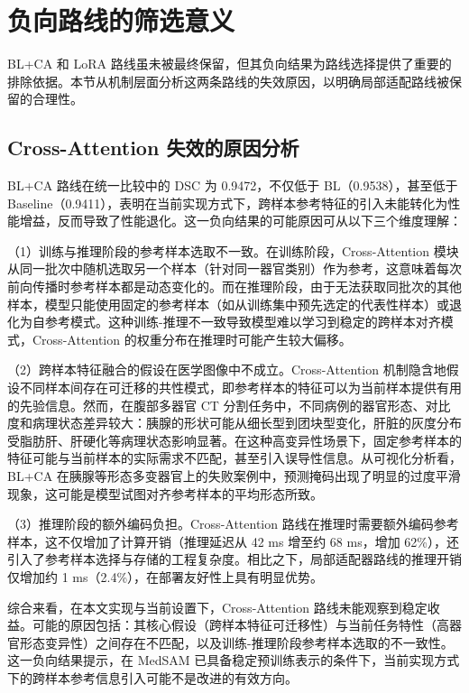 \section{负向路线的筛选意义}

BL+CA 和 LoRA 路线虽未被最终保留，但其负向结果为路线选择提供了重要的排除依据。本节从机制层面分析这两条路线的失效原因，以明确局部适配路线被保留的合理性。

\subsection{Cross-Attention 失效的原因分析}

BL+CA 路线在统一比较中的 DSC 为 0.9472，不仅低于 BL（0.9538），甚至低于 Baseline（0.9411），表明在当前实现方式下，跨样本参考特征的引入未能转化为性能增益，反而导致了性能退化。这一负向结果的可能原因可从以下三个维度理解：

（1）训练与推理阶段的参考样本选取不一致。在训练阶段，Cross-Attention 模块从同一批次中随机选取另一个样本（针对同一器官类别）作为参考，这意味着每次前向传播时参考样本都是动态变化的。而在推理阶段，由于无法获取同批次的其他样本，模型只能使用固定的参考样本（如从训练集中预先选定的代表性样本）或退化为自参考模式。这种训练-推理不一致导致模型难以学习到稳定的跨样本对齐模式，Cross-Attention 的权重分布在推理时可能产生较大偏移。

（2）跨样本特征融合的假设在医学图像中不成立。Cross-Attention 机制隐含地假设不同样本间存在可迁移的共性模式，即参考样本的特征可以为当前样本提供有用的先验信息。然而，在腹部多器官 CT 分割任务中，不同病例的器官形态、对比度和病理状态差异较大：胰腺的形状可能从细长型到团块型变化，肝脏的灰度分布受脂肪肝、肝硬化等病理状态影响显著。在这种高变异性场景下，固定参考样本的特征可能与当前样本的实际需求不匹配，甚至引入误导性信息。从可视化分析看，BL+CA 在胰腺等形态多变器官上的失败案例中，预测掩码出现了明显的过度平滑现象，这可能是模型试图对齐参考样本的平均形态所致。

（3）推理阶段的额外编码负担。Cross-Attention 路线在推理时需要额外编码参考样本，这不仅增加了计算开销（推理延迟从 42 ms 增至约 68 ms，增加 62\%），还引入了参考样本选择与存储的工程复杂度。相比之下，局部适配器路线的推理开销仅增加约 1 ms（2.4\%），在部署友好性上具有明显优势。

综合来看，在本文实现与当前设置下，Cross-Attention 路线未能观察到稳定收益。可能的原因包括：其核心假设（跨样本特征可迁移性）与当前任务特性（高器官形态变异性）之间存在不匹配，以及训练-推理阶段参考样本选取的不一致性。这一负向结果提示，在 MedSAM 已具备稳定预训练表示的条件下，当前实现方式下的跨样本参考信息引入可能不是改进的有效方向。

